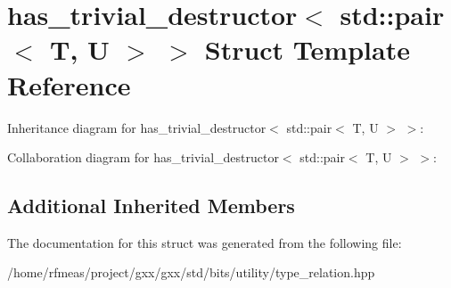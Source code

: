 \hypertarget{structhas__trivial__destructor_3_01std_1_1pair_3_01T_00_01U_01_4_01_4}{}\section{has\+\_\+trivial\+\_\+destructor$<$ std\+:\+:pair$<$ T, U $>$ $>$ Struct Template Reference}
\label{structhas__trivial__destructor_3_01std_1_1pair_3_01T_00_01U_01_4_01_4}


Inheritance diagram for has\+\_\+trivial\+\_\+destructor$<$ std\+:\+:pair$<$ T, U $>$ $>$\+:


Collaboration diagram for has\+\_\+trivial\+\_\+destructor$<$ std\+:\+:pair$<$ T, U $>$ $>$\+:
\subsection*{Additional Inherited Members}


The documentation for this struct was generated from the following file\+:\begin{DoxyCompactItemize}
\item 
/home/rfmeas/project/gxx/gxx/std/bits/utility/type\+\_\+relation.\+hpp\end{DoxyCompactItemize}
